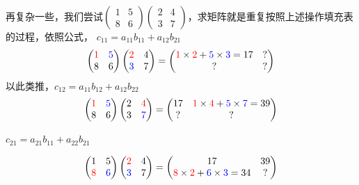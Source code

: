 再复杂一些，我们尝试$\begin{pmatrix}  
	1 & 5 \\  
	8 & 6  
  \end{pmatrix} \begin{pmatrix}  
	2 & 4 \\  
	3 & 7  
  \end{pmatrix}$，求矩阵就是重复按照上述操作填充表的过程，依照公式，
$c_{11}=a_{11}b_{11}+a_{12}b_{21}$
$$\begin{pmatrix}  
	\textcolor{red}{1} & \textcolor{blue}{5} \\  
	8 & 6  
  \end{pmatrix} \begin{pmatrix}  
	\textcolor{red}{2} & 4 \\  
	\textcolor{blue}{3} & 7  
  \end{pmatrix}=\begin{pmatrix}  
	\textcolor{red}{1}\times\textcolor{red}{2}+\textcolor{blue}{5}\times \textcolor{blue}{3}=17 & ? \\  
	? & ?  
\end{pmatrix} $$
以此类推，$c_{12}=a_{11}b_{12}+a_{12}b_{22}$
$$\begin{pmatrix}  
	\textcolor{red}{1} & \textcolor{blue}{5} \\  
	8 & 6  
  \end{pmatrix} \begin{pmatrix}  
	2 & \textcolor{red}{4} \\  
	3 & \textcolor{blue}{7}  
  \end{pmatrix}=\begin{pmatrix}  
	17&\textcolor{red}{1}\times \textcolor{red}{4} +\textcolor{blue}{5}\times \textcolor{blue}{7} =39 \\  
	? & ?  
\end{pmatrix} $$

$c_{21}=a_{21}b_{11}+a_{22}b_{21}$

$$\begin{pmatrix}  
	1 & 5 \\  
	\textcolor{red}{8} & \textcolor{blue}{6}  
  \end{pmatrix} \begin{pmatrix}  
	\textcolor{red}{2} & {4} \\  
	\textcolor{blue}{3} & {7}  
  \end{pmatrix}=\begin{pmatrix}  
	17 & 39 \\  
	\textcolor{red}{8}\times \textcolor{red}{2}+\textcolor{blue}{6} \times\textcolor{blue}{3}=34 & ?  
\end{pmatrix} $$


